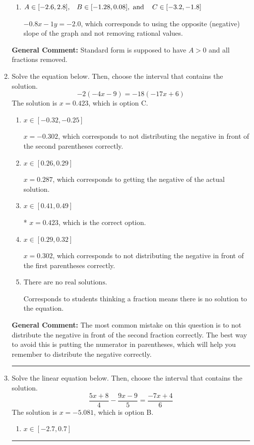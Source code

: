 \documentclass{extbook}[14pt]
\newcommand{\litem}[1]{\item #1

\rule{\textwidth}{0.4pt}}
\begin{document}
\begin{enumerate}
{\begin{enumerate}[label=\Alph*.]
 $4x + 5y = 10$, which corresponds to using the opposite (negative) slope of the graph, but did everything else correctly.
\item \( A \in [-2.6, 2.8], \hspace{3mm} B \in [-1.28, 0.08], \text{ and } \hspace{3mm} C \in [-3.2, -1.8] \)

 $-0.8x - 1y = -2.0$, which corresponds to using the opposite (negative) slope of the graph and not removing rational values.
\end{enumerate}

\textbf{General Comment:} Standard form is supposed to have $A > 0$ and all fractions removed.
}
\litem{
Solve the equation below. Then, choose the interval that contains the solution.
\[ -2(-4x -9) = -18(-17x + 6) \]The solution is \( x = 0.423 \), which is option C.\begin{enumerate}[label=\Alph*.]
\item \( x \in [-0.32, -0.25] \)

$x = -0.302$, which corresponds to not distributing the negative in front of the second parentheses correctly.
\item \( x \in [0.26, 0.29] \)

$x = 0.287$, which corresponds to getting the negative of the actual solution.
\item \( x \in [0.41, 0.49] \)

* $x = 0.423$, which is the correct option.
\item \( x \in [0.29, 0.32] \)

$x = 0.302$, which corresponds to not distributing the negative in front of the first parentheses correctly.
\item \( \text{There are no real solutions.} \)

Corresponds to students thinking a fraction means there is no solution to the equation.
\end{enumerate}

\textbf{General Comment:} The most common mistake on this question is to not distribute the negative in front of the second fraction correctly. The best way to avoid this is putting the numerator in parentheses, which will help you remember to distribute the negative correctly.
}
\litem{
Solve the linear equation below. Then, choose the interval that contains the solution.
\[ \frac{5x + 8}{4} - \frac{9x -9}{5} = \frac{-7x + 4}{6} \]The solution is \( x = -5.081 \), which is option B.\begin{enumerate}[label=\Alph*.]
\item \( x \in [-2.7, 0.7] \)


\end{enumerate}}
\end{enumerate}
\end{document}
